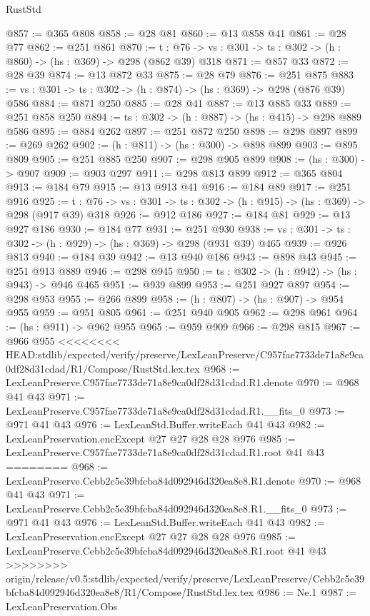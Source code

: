 \begin{lexlean}{RustStd}
\begin{coremodule}
{\begin{coremodule}
{@857 := @365 @808
@858 := @28 @81
@860 := @13 @858 @41
@861 := @28 @77
@862 := @251 @861
@870 := {t : @76} -> {vs : @301} -> {ts : @302} -> (h : @860) -> (hs : @369) -> @298 (@862 @39) @318
@871 := @857 @33
@872 := @28 @39
@874 := @13 @872 @33
@875 := @28 @79
@876 := @251 @875
@883 := {vs : @301} -> {ts : @302} -> (h : @874) -> (hs : @369) -> @298 (@876 @39) @586
@884 := @871 @250
@885 := @28 @41
@887 := @13 @885 @33
@889 := @251 @858 @250
@894 := {ts : @302} -> (h : @887) -> (hs : @415) -> @298 @889 @586
@895 := @884 @262
@897 := @251 @872 @250
@898 := @298 @897
@899 := @269 @262
@902 := (h : @811) -> (hs : @300) -> @898 @899
@903 := @895 @809
@905 := @251 @885 @250
@907 := @298 @905 @899
@908 := (hs : @300) -> @907
@909 := @903 @297
@911 := @298 @813 @899
@912 := @365 @804
@913 := @184 @79
@915 := @13 @913 @41
@916 := @184 @89
@917 := @251 @916
@925 := {t : @76} -> {vs : @301} -> {ts : @302} -> (h : @915) -> (hs : @369) -> @298 (@917 @39) @318
@926 := @912 @186
@927 := @184 @81
@929 := @13 @927 @186
@930 := @184 @77
@931 := @251 @930
@938 := {vs : @301} -> {ts : @302} -> (h : @929) -> (hs : @369) -> @298 (@931 @39) @465
@939 := @926 @813
@940 := @184 @39
@942 := @13 @940 @186
@943 := @898 @43
@945 := @251 @913 @889
@946 := @298 @945
@950 := {ts : @302} -> (h : @942) -> (hs : @943) -> @946 @465
@951 := @939 @899
@953 := @251 @927 @897
@954 := @298 @953
@955 := @266 @899
@958 := (h : @807) -> (hs : @907) -> @954 @955
@959 := @951 @805
@961 := @251 @940 @905
@962 := @298 @961
@964 := (hs : @911) -> @962 @955
@965 := @959 @909
@966 := @298 @815
@967 := @966 @955
<<<<<<<< HEAD:stdlib/expected/verify/preserve/LexLeanPreserve/C957fae7733de71a8e9ca0df28d31cdad/R1/Compose/RustStd.lex.tex
@968 := LexLeanPreserve.C957fae7733de71a8e9ca0df28d31cdad.R1.denote
@970 := @968 @41 @43
@971 := LexLeanPreserve.C957fae7733de71a8e9ca0df28d31cdad.R1.__fits_0
@973 := @971 @41 @43
@976 := LexLeanStd.Buffer.writeEach @41 @43
@982 := LexLeanPreservation.encExcept @27 @27 @28 @28 @976
@985 := LexLeanPreserve.C957fae7733de71a8e9ca0df28d31cdad.R1.root @41 @43
========
@968 := LexLeanPreserve.Cebb2c5e39bfcba84d092946d320ea8e8.R1.denote
@970 := @968 @41 @43
@971 := LexLeanPreserve.Cebb2c5e39bfcba84d092946d320ea8e8.R1.__fits_0
@973 := @971 @41 @43
@976 := LexLeanStd.Buffer.writeEach @41 @43
@982 := LexLeanPreservation.encExcept @27 @27 @28 @28 @976
@985 := LexLeanPreserve.Cebb2c5e39bfcba84d092946d320ea8e8.R1.root @41 @43
>>>>>>>> origin/release/v0.5:stdlib/expected/verify/preserve/LexLeanPreserve/Cebb2c5e39bfcba84d092946d320ea8e8/R1/Compose/RustStd.lex.tex
@986 := Ne.{1}
@987 := LexLeanPreservation.Obs
}
\end{coremodule}}
\end{coremodule}
\end{lexlean}
